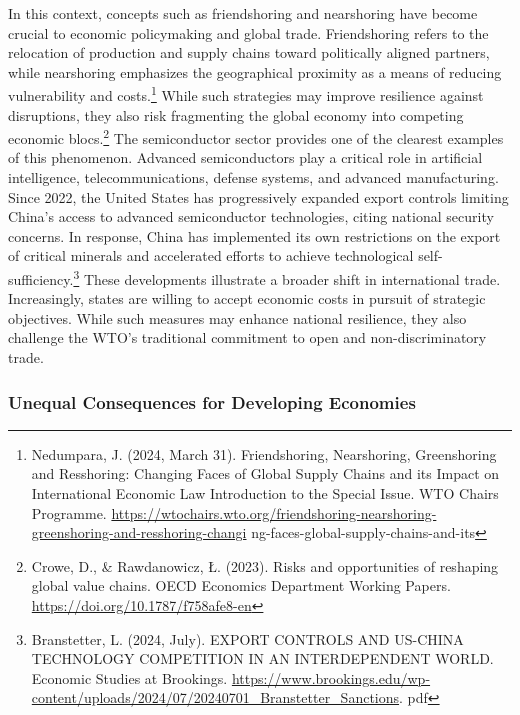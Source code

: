 In this context, concepts such as friendshoring and nearshoring have become crucial to economic policymaking and global trade. Friendshoring refers to the relocation of production and supply chains toward politically aligned partners, while nearshoring emphasizes the geographical proximity as a means of reducing vulnerability and costs.\footnote{Nedumpara, J. (2024, March 31). Friendshoring, Nearshoring, Greenshoring and Resshoring: Changing Faces of Global Supply Chains and its Impact on International Economic Law Introduction to the Special Issue. WTO Chairs Programme. \url{https://wtochairs.wto.org/friendshoring-nearshoring-greenshoring-and-resshoring-changi} ng-faces-global-supply-chains-and-its} While such strategies may improve resilience against disruptions, they also risk fragmenting the global economy into competing economic blocs.\footnote{Crowe, D., \& Rawdanowicz, Ł. (2023). Risks and opportunities of reshaping global value chains. OECD Economics Department Working Papers. \url{https://doi.org/10.1787/f758afe8-en}} The semiconductor sector provides one of the clearest examples of this phenomenon. Advanced semiconductors play a critical role in artificial intelligence, telecommunications, defense systems, and advanced manufacturing. Since 2022, the United States has progressively expanded export controls limiting China's access to advanced semiconductor technologies, citing national security concerns. In response, China has implemented its own restrictions on the export of critical minerals and accelerated efforts to achieve technological self-sufficiency.\footnote{Branstetter, L. (2024, July). EXPORT CONTROLS AND US-CHINA TECHNOLOGY COMPETITION IN AN INTERDEPENDENT WORLD. Economic Studies at Brookings. \url{https://www.brookings.edu/wp-content/uploads/2024/07/20240701_Branstetter_Sanctions}. pdf} These developments illustrate a broader shift in international trade. Increasingly, states are willing to accept economic costs in pursuit of strategic objectives. While such measures may enhance national resilience, they also challenge the WTO's traditional commitment to open and non-discriminatory trade.

\subsubsection{Unequal Consequences for Developing Economies}

